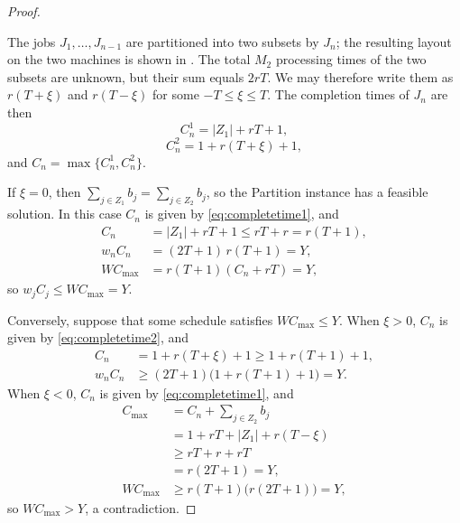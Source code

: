 \documentclass[12pt]{article}
\renewcommand{\thefigure}{\arabic{figure}}
\begin{document}
\begin{sloppypar}
\begin{proof}
\begin{center}
\label{fig:nphard-partition}
\end{center}

The jobs $J_1,\dots,J_{n-1}$ are partitioned into two subsets by $J_n$; the resulting layout on the
two machines is shown in . The total $M_2$ processing times of the two subsets
are unknown, but their sum equals $2rT$. We may therefore write them as $r(T+\xi)$ and $r(T-\xi)$
for some $-T\le\xi\le T$. The completion times of $J_n$ are then
\begin{equation}\label{eq:completetime1}
    C_n^1 = |Z_1| + rT + 1,
\end{equation}
\begin{equation}\label{eq:completetime2}
    C_n^2 = 1 + r(T+\xi) + 1,
\end{equation}
and $C_n = \max\{C_n^1, C_n^2\}$.

If $\xi=0$, then $\sum_{j\in Z_1}b_j=\sum_{j\in Z_2}b_j$, so the Partition instance has a feasible
solution. In this case $C_n$ is given by \cref{eq:completetime1}, and
\begin{align*}
C_n &= |Z_1| + rT + 1 \le rT + r = r(T+1), \\
w_nC_n &= (2T+1)\,r(T+1) = Y, \\
W C_{\max} &= r(T+1)(C_n + rT) = Y,
\end{align*}
so $w_jC_j\le W C_{\max}=Y$.

Conversely, suppose that some schedule satisfies $W C_{\max}\le Y$. When $\xi>0$, $C_n$ is given by
\cref{eq:completetime2}, and
\begin{align*}
C_n &= 1 + r(T+\xi) + 1 \ge 1 + r(T+1) + 1, \\
w_nC_n &\ge (2T+1)\bigl(1 + r(T+1) + 1\bigr) = Y.
\end{align*}
When $\xi<0$, $C_n$ is given by \cref{eq:completetime1}, and
\begin{align*}
C_{\max} &= C_n + \sum_{j\in Z_2}b_j \\
         &= 1 + rT + |Z_1| + r(T-\xi) \\
         &\ge rT + r + rT \\
         &= r(2T+1) = Y, \\
WC_{\max} &\ge r(T+1)\bigl(r(2T+1)\bigr) = Y,
\end{align*}
so $W C_{\max}>Y$, a contradiction.


\end{proof}
\end{sloppypar}
\end{document}
